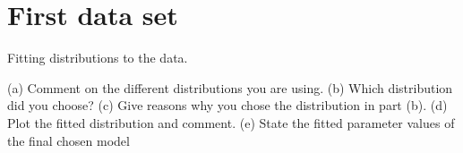 \section{First data set}

Fitting distributions to the data.

(a) Comment on the different distributions you are using.
(b) Which distribution did you choose?
(c) Give reasons why you chose the distribution in part (b).
(d) Plot the fitted distribution and comment.
(e) State the fitted parameter values of the final chosen model

